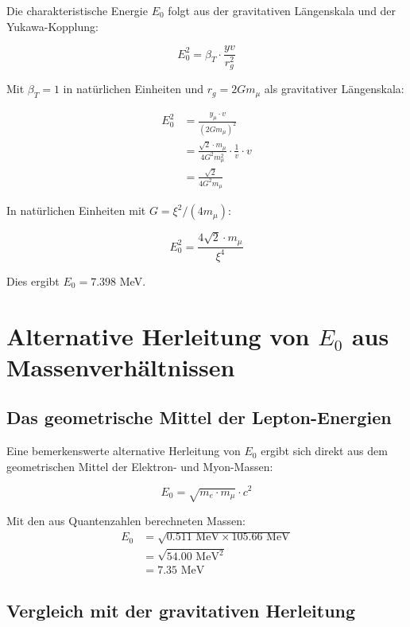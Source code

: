 \documentclass[12pt,a4paper]{article}
\theoremstyle{definition}
\begin{document}
	Die charakteristische Energie $E_0$ folgt aus der gravitativen L\"angenskala und der Yukawa-Kopplung:
	
	\begin{equation}
		E_0^2 = \beta_T \cdot \frac{yv}{r_g^2}
	\end{equation}
	
	Mit $\beta_T = 1$ in nat\"urlichen Einheiten und $r_g = 2Gm_\mu$ als gravitativer L\"angenskala:
	
	\begin{align}
		E_0^2 &= \frac{y_\mu \cdot v}{(2Gm_\mu)^2}\\
		&= \frac{\sqrt{2} \cdot m_\mu}{4G^2 m_\mu^2} \cdot \frac{1}{v} \cdot v\\
		&= \frac{\sqrt{2}}{4G^2 m_\mu}
	\end{align}
	
	In nat\"urlichen Einheiten mit $G = \xi^2/(4m_\mu)$:
	
	\begin{equation}
		E_0^2 = \frac{4\sqrt{2} \cdot m_\mu}{\xi^4}
	\end{equation}
	
	Dies ergibt $E_0 = 7.398$ MeV.
	
	\section{Alternative Herleitung von $E_0$ aus Massenverh\"altnissen}
	
	\subsection{Das geometrische Mittel der Lepton-Energien}
	
	Eine bemerkenswerte alternative Herleitung von $E_0$ ergibt sich direkt aus dem geometrischen Mittel der Elektron- und Myon-Massen:
	
	\begin{equation}
		E_0 = \sqrt{m_e \cdot m_\mu} \cdot c^2
	\end{equation}
	
	Mit den aus Quantenzahlen berechneten Massen:
	\begin{align}
		E_0 &= \sqrt{0.511 \text{ MeV} \times 105.66 \text{ MeV}}\\
		&= \sqrt{54.00 \text{ MeV}^2}\\
		&= 7.35 \text{ MeV}
	\end{align}
	
	\subsection{Vergleich mit der gravitativen Herleitung}
	
\end{document}
